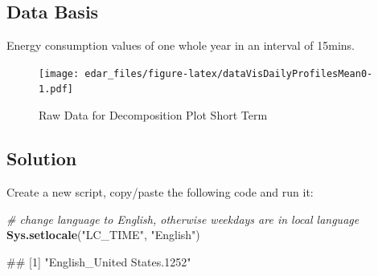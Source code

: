 \documentclass[
]{book}
\newenvironment{Shaded}{\begin{snugshade}}{\end{snugshade}}
\newcommand{\CommentTok}[1]{\textcolor[rgb]{0.56,0.35,0.01}{\textit{#1}}}
\newcommand{\KeywordTok}[1]{\textcolor[rgb]{0.13,0.29,0.53}{\textbf{#1}}}
\newcommand{\NormalTok}[1]{#1}
\newcommand{\StringTok}[1]{\textcolor[rgb]{0.31,0.60,0.02}{#1}}
\let\oldShaded\Shaded
\let\endoldShaded\endShaded
\renewenvironment{Shaded}{\footnotesize\oldShaded}{\endoldShaded}
\let\oldverbatim\verbatim
\let\endoldverbatim\endverbatim
\renewenvironment{verbatim}{\footnotesize\oldverbatim}{\endoldverbatim}
\begin{document}
\hypertarget{data-basis-10}{%
\subsection{Data Basis}\label{data-basis-10}}

Energy consumption values of one whole year in an interval of 15mins.

\begin{figure}
\centering
\texttt{[image: edar\_files/figure-latex/dataVisDailyProfilesMean0-1.pdf]}
\caption{\label{fig:dataVisDailyProfilesMean0}Raw Data for Decomposition Plot Short Term}
\end{figure}

\hypertarget{solution-10}{%
\subsection{Solution}\label{solution-10}}

Create a new script, copy/paste the following code and run it:

\begin{Shaded}
\begin{Highlighting}[]
\CommentTok{# change language to English, otherwise weekdays are in local language}
\KeywordTok{Sys.setlocale}\NormalTok{(}\StringTok{"LC_TIME"}\NormalTok{, }\StringTok{"English"}\NormalTok{)}
\end{Highlighting}
\end{Shaded}

\begin{verbatim}
## [1] "English_United States.1252"
\end{verbatim}
\end{document}
